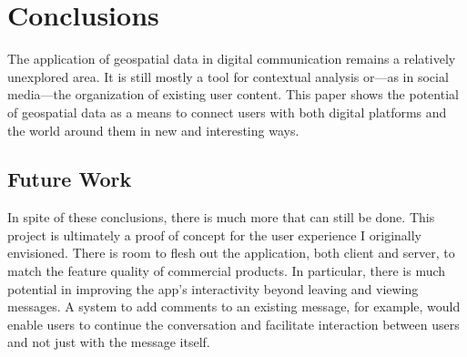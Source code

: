 \section{Conclusions}

The application of geospatial data in digital communication remains a relatively unexplored area. It is still mostly a tool for contextual analysis or—as in social media—the organization of existing user content. This paper shows the potential of geospatial data as a means to connect users with both digital platforms and the world around them in new and interesting ways.

\subsection{Future Work}

In spite of these conclusions, there is much more that can still be done. This project is ultimately a proof of concept for the user experience I originally envisioned. There is room to flesh out the application, both client and server, to match the feature quality of commercial products. In particular, there is much potential in improving the app's interactivity beyond leaving and viewing messages. A system to add comments to an existing message, for example, would enable users to continue the conversation and facilitate interaction between users and not just with the message itself.

